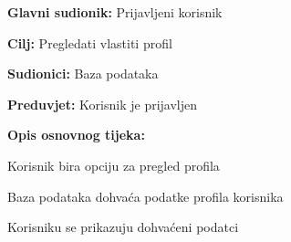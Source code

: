 \noindent {}
\begin{packed_item}

\item \textbf{Glavni sudionik:} Prijavljeni korisnik
\item  \textbf{Cilj:} Pregledati vlastiti profil
\item  \textbf{Sudionici:} Baza podataka
\item  \textbf{Preduvjet:} Korisnik je prijavljen
\item  \textbf{Opis osnovnog tijeka:}

\item[] \begin{packed_enum}

    \item Korisnik bira opciju za pregled profila
    \item Baza podataka dohvaća podatke profila korisnika
    \item Korisniku se prikazuju dohvaćeni podatci

\end{packed_enum}

\end{packed_item}

